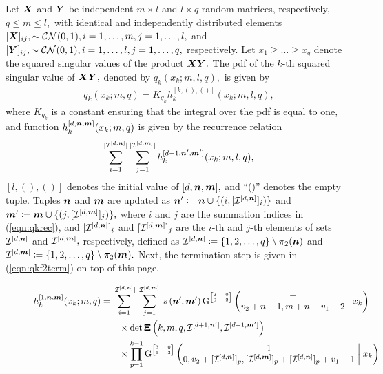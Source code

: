 \begin{theorem}
	\label{thm:qk}
	Let $\boldsymbol{X}$ and $\boldsymbol{Y}$ be independent $m\times l$ and $l\times q$ random matrices, respectively, $q \leq m \leq l,$ with identical and independently distributed elements $[\boldsymbol{X}]_{ij}, \sim \mathcal{CN}(0,1), i=1,\dots,m,j=1,\dots,l,$ and $[\boldsymbol{Y}]_{ij}, \sim \mathcal{CN}(0,1), i=1,\dots,l,j=1,\dots,q,$ respectively. Let $x_1 \geq \dots \geq x_q$ denote the squared singular values of the product $\boldsymbol{X}\boldsymbol{Y}.$ The pdf of the $k$-th squared singular value of $\boldsymbol{X}\boldsymbol{Y},$ denoted by $q_k(x_k; m, l, q),$ is given by
	\begin{align}
		q_k(x_k; m, q) = K_{q_k} h^{[k,(),()]}_k(x_k; m, l, q),
	\end{align}
	where $K_{q_k}$ is a constant ensuring that the integral over the pdf is equal to one, and function $h^{[d,\boldsymbol{n},\boldsymbol{m}]}_k(x_k; m, q)$ is given by the recurrence relation
	\begin{align}
		\sum_{i = 1}^{|{\mathcal{I}}^{[d,\boldsymbol{n}]}|} \sum_{j = 1}^{|{\mathcal{I}}^{[d,\boldsymbol{m}]}|} h^{[d-1,\boldsymbol{n}',\boldsymbol{m}']}_k(x_k; m,l,q), \label{eqn:qkrec}
	\end{align}
	$[l,(),()]$ denotes the initial value of $[d,\boldsymbol{n},\boldsymbol{m}],$ and ``()'' denotes the empty tuple. Tuples $\boldsymbol{n}$ and $\boldsymbol{m}$ are updated as $\boldsymbol{n}' \coloneqq \boldsymbol{n} \cup \{(i,[{\mathcal{I}}^{[d,\boldsymbol{n}]}]_i)\}$ and $\boldsymbol{m}' \coloneqq \boldsymbol{m} \cup \{(j,[{\mathcal{I}}^{[d,\boldsymbol{m}]}]_j)\},$ where $i$ and $j$ are the summation indices in (\ref{eqn:qkrec}), and $[{\mathcal{I}}^{[d,\boldsymbol{n}]}]_i$ and $[{\mathcal{I}}^{[d,\boldsymbol{m}]}]_j$ are the $i$-th and $j$-th elements of sets ${\mathcal{I}}^{[d, \boldsymbol{n}]}$ and ${\mathcal{I}}^{[d, \boldsymbol{m}]},$ respectively, defined as ${\mathcal{I}}^{[d,\boldsymbol{n}]} \coloneqq \{1,2,\dots,q\} \setminus \pi_2(\boldsymbol{n})$ and ${\mathcal{I}}^{[d,\boldsymbol{m}]} \coloneqq \{1,2,\dots,q\} \setminus \pi_2(\boldsymbol{m}).$ Next, the termination step is given in (\ref{eqn:qkf2term}) on top of this page,
	\begin{figure*}
		\begin{align}
			h^{[1,\bo{n},\bo{m}]}_k(x_k; m, q) &= \sum_{i = 1}^{|{\mathcal{I}}^{[d,\bo{n}]}|} \sum_{j = 1}^{|{\mathcal{I}}^{[d,\bo{m}]}|} s\left(\bo{n}',\bo{m}'\right)
			\G{2}{0}{0}{2}{-}{v_2+n-1, m+n+v_1-2}{x_k} \nonumber\\
			&\qquad \times \det{\bo{\Xi}\left(k, m, q, {\mathcal{I}}^{[d+1,\bo{n}']},{\mathcal{I}}^{[d+1,\bo{m}']}\right)} \nonumber\\
			&\qquad \times \prod_{p = 1}^{k-1} \G{3}{0}{1}{3}{1}{0, v_2+[{\mathcal{I}}^{[d,\bo{n}]}]_p, [{\mathcal{I}}^{[d,\bo{m}]}]_p + [{\mathcal{I}}^{[d,\bo{n}]}]_p+v_1 - 1}{x_k}\label{eqn:qkf2term}

\end{align}
\end{figure*}
\end{theorem}
